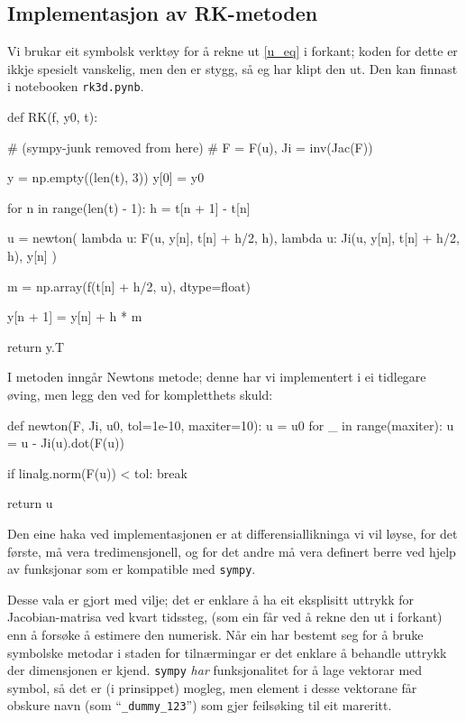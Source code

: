 \documentclass[12pt]{article}
\begin{document}
\begin{multicols*}{2}
    \subsection{Implementasjon av RK-metoden}
    Vi brukar eit symbolsk verktøy for å rekne ut \eqref{u_eq}
    i forkant; koden for dette er ikkje spesielt vanskelig,
    men den er stygg, så eg har klipt den ut.
    Den kan finnast i notebooken {\tt rk3d.pynb}.

\begin{python}[caption={Implisitt Runge-Kutta midtpunktmetode.}]
def RK(f, y0, t):

# (sympy-junk removed from here)
# F = F(u), Ji = inv(Jac(F))

y = np.empty((len(t), 3))
y[0] = y0

for n in range(len(t) - 1):
    h = t[n + 1] - t[n]

    u = newton(
        lambda u:  F(u, y[n], t[n] + h/2, h),
        lambda u: Ji(u, y[n], t[n] + h/2, h),
        y[n]
    )

    m = np.array(f(t[n] + h/2, u), dtype=float)

    y[n + 1] = y[n] + h * m

return y.T
\end{python}
I metoden inngår Newtons metode;
denne har vi implementert i ei tidlegare øving,
men legg den ved for kompletthets skuld:
\begin{python}[caption={Newtons metode frå tidlegare øving.}]
def newton(F, Ji, u0, tol=1e-10, maxiter=10):
    u = u0
    for _ in range(maxiter):
        u = u - Ji(u).dot(F(u))

        if linalg.norm(F(u)) < tol:
            break

    return u
\end{python}
Den eine haka ved implementasjonen er at differensiallikninga vi
vil løyse, for det første, må vera tredimensjonell,
og for det andre må vera definert berre ved hjelp av
funksjonar som er kompatible med {\tt sympy}.

Desse vala er gjort med vilje;
det er enklare å ha eit eksplisitt uttrykk for
Jacobian-matrisa ved kvart tidssteg, (som ein får ved å rekne den ut i forkant)
enn å forsøke å estimere den numerisk.
Når ein har bestemt seg for å bruke symbolske metodar
i staden for tilnærmingar er det enklare å
behandle uttrykk der dimensjonen er kjend.
{\tt sympy} {\em har} funksjonalitet for å lage
vektorar med symbol, så det er (i prinsippet) mogleg,
men element i desse vektorane får obskure navn (som ``{\tt \_dummy\_123}'')
som gjer feilsøking til eit mareritt.


\end{multicols*}
\end{document}
